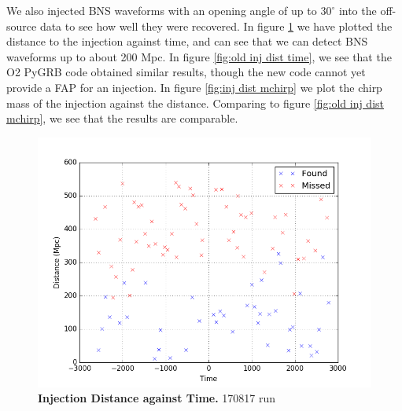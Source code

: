 \documentclass[11pt]{cuthesis}
\begin{document}
We also injected BNS waveforms with an opening angle of up to $30^\circ$ into the off-source data to see how well they were recovered. In figure \ref{fig:inj dist time} we have plotted the distance to the injection against time, and can see that we can detect BNS waveforms up to about 200 Mpc. In figure \ref{fig:old inj dist time}, we see that the O2 PyGRB code obtained similar results, though the new code cannot yet provide a FAP for an injection. In figure \ref{fig:inj dist mchirp} we plot the chirp mass of the injection against the distance. Comparing to figure \ref{fig:old inj dist mchirp}, we see that the results are comparable.





\begin{figure} %
\begin{center}
\includegraphics[width=0.8\linewidth]{injections_dist_time.png}
\end{center}
\caption{\textbf{Injection Distance against Time.} 170817 run} 
\label{fig:inj dist time}
\end{figure}
\end{document}
